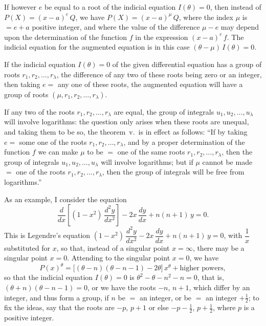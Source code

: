 \documentclass[11pt]{article}
\begin{document}
If however $e$ be equal to a root of the indicial equation $I(\theta) = 0$, then instead of $P(X) = (x-a)^{e}\,Q$, we have $P(X) = (x-a)^{\mu}\,Q$, where the index $\mu$ is $= e + a$ positive integer, and where the value of the difference $\mu - e$ may depend upon the determination of the function $f$ in the expression $(x-a)^{e}\,f$. The indicial equation for the augmented equation is in this case $(\theta - \mu)\,I(\theta) = 0$.

If the indicial equation $I(\theta) = 0$ of the given differential equation has a group of roots $r_{1}, r_{2}, \ldots, r_{\lambda}$, the difference of any two of these roots being zero or an integer, then taking $e = $ any one of these roots, the augmented equation will have a group of roots $(\mu, r_{1}, r_{2}, \ldots, r_{\lambda})$.

If any two of the roots $r_{1}, r_{2}, \ldots, r_{\lambda}$ are equal, the group of integrals $u_{1}, u_{2}, \ldots, u_{\lambda}$ will involve logarithms: the question only arises when these roots are unequal, and taking them to be so, the theorem~v.\ is in effect as follows: ``If by taking $e = $ some one of the roots $r_{1}, r_{2}, \ldots, r_{\lambda}$, and by a proper determination of the function $f$ we can make $\mu$ to be $= $ one of the same roots $r_{1}, r_{2}, \ldots, r_{\lambda}$, then the group of integrals $u_{1}, u_{2}, \ldots, u_{\lambda}$ will involve logarithms; but if $\mu$ cannot be made $= $ one of the roots $r_{1}, r_{2}, \ldots, r_{\lambda}$, then the group of integrals will be free from logarithms.''

As an example, I consider the equation
\[
\frac{d}{dx}\!\left[(1-x^{2})\,\frac{d^{2}y}{dx^{2}}\right] - 2x\,\frac{dy}{dx} + n(n+1)\,y = 0.
\]
This is Legendre's equation $(1-x^{2})\,\dfrac{d^{2}y}{dx^{2}} - 2x\,\dfrac{dy}{dx} + n(n+1)\,y = 0$, with $\dfrac{1}{x}$ substituted for $x$, so that, instead of a singular point $x = \infty$, there may be a singular point $x = 0$. Attending to the singular point $x = 0$, we have
\[
P(x)^{\theta} = \bigl[(\theta - n)(\theta - n - 1) - 2\theta\bigr]\,x^{\theta} + \text{higher powers},
\]
so that the indicial equation $I(\theta) = 0$ is $\theta^{2} - \theta - n^{2} - n = 0$, that is, $(\theta + n)(\theta - n - 1) = 0$, or we have the roots $-n$, $n + 1$, which differ by an integer, and thus form a group, if $n$ be $= $ an integer, or be $= $ an integer $+ \tfrac{1}{2}$; to fix the ideas, say that the roots are $-p$, $p + 1$ or else $-p - \tfrac{1}{2}$, $p + \tfrac{1}{2}$, where $p$ is a positive integer.
\end{document}
